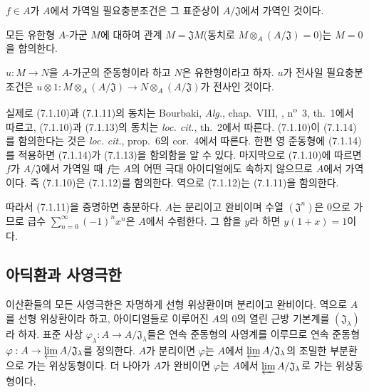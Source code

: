 \begin{corollary}[7.1.12]
\label{0.7.1.12-ko}
$f\in A$가 $A$에서 가역일 필요충분조건은 그 표준상이
$A/\mathfrak J$에서 가역인 것이다.
\end{corollary}

\begin{corollary}[7.1.13]
\label{0.7.1.13-ko}
모든 유한형 $A$-가군 $M$에 대하여 관계 $M=\mathfrak JM$(동치로
$M\otimes_A(A/\mathfrak J)=0$)는 $M=0$을 함의한다.
\end{corollary}

\begin{corollary}[7.1.14]
\label{0.7.1.14-ko}
$u:M\to N$을 $A$-가군의 준동형이라 하고 $N$은 유한형이라고 하자.
$u$가 전사일 필요충분조건은
$u\otimes1:M\otimes_A(A/\mathfrak J)\to
N\otimes_A(A/\mathfrak J)$가 전사인 것이다.
\end{corollary}

실제로 (7.1.10)과 (7.1.11)의 동치는 Bourbaki, \emph{Alg.},
chap.~VIII, , n\textsuperscript{o}~3, th.~1에서 따르고,
(7.1.10)과 (7.1.13)의 동치는 \emph{loc. cit.}, th.~2에서 따른다.
(7.1.10)이 (7.1.14)를 함의한다는 것은 \emph{loc. cit.}, prop.~6의
cor.~4에서 따른다. 한편 영 준동형에 (7.1.14)를 적용하면
(7.1.14)가 (7.1.13)을 함의함을 알 수 있다. 마지막으로 (7.1.10)에
따르면 $f$가 $A/\mathfrak J$에서 가역일 때 $f$는 $A$의 어떤 극대
아이디얼에도 속하지 않으므로 $A$에서 가역이다. 즉 (7.1.10)은
(7.1.12)를 함의한다. 역으로 (7.1.12)는 (7.1.11)을 함의한다.

따라서 (7.1.11)을 증명하면 충분하다. $A$는 분리이고 완비이며
수열 $(\mathfrak J^n)$은 $0$으로 가므로 급수
$\sum_{n=0}^{\infty}(-1)^n x^n$은 $A$에서 수렴한다. 그 합을 $y$라
하면 $y(1+x)=1$이다.

\subsection{아딕환과 사영극한}
\label{subsection:0.7.2-ko}

\begin{env}[7.2.1]
\label{0.7.2.1-ko}
이산환들의 모든 사영극한은 자명하게 선형 위상환이며 분리이고
완비이다. 역으로 $A$를 선형 위상환이라 하고, 아이디얼들로 이루어진
$A$의 $0$의 열린 근방 기본계를 $(\mathfrak J_\lambda)$라 하자.
표준 사상
$\varphi_\lambda:A\to A/\mathfrak J_\lambda$들은 연속 준동형의
사영계를 이루므로 연속 준동형
$\varphi:A\to\varprojlim A/\mathfrak J_\lambda$를 정의한다. $A$가
분리이면 $\varphi$는 $A$에서
$\varprojlim A/\mathfrak J_\lambda$의 조밀한 부분환으로 가는
위상동형이다. 더 나아가 $A$가 완비이면 $\varphi$는 $A$에서
$\varprojlim A/\mathfrak J_\lambda$로 가는 위상동형이다.
\end{env}

